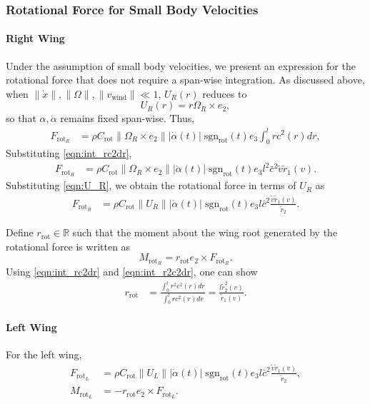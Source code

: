 \documentclass[10pt,draft]{article}
\renewcommand{\Re}{\ensuremath{\mathbb{R}}}
\newcommand{\rot}{\ensuremath{\mathrm{rot}}}
\begin{document}
\subsubsection{Rotational Force for Small Body Velocities}

\paragraph{Right Wing}

Under the assumption of small body velocities, we present an expression for the rotational force that does not require a span-wise integration. 
As discussed above, when $\|\dot x\|,\|\Omega\|, \|v_{\mathrm{wind}}\| \ll 1$, $U_R(r)$ reduces to
\[
    U_R(r) = r \Omega_R \times e_2,
\]
so that $\alpha,\dot\alpha$ remains fixed span-wise. 
Thus,
\begin{align*}
    F_{\rot_R} & = \rho C_\rot  \|\Omega_R \times e_2 \| |\dot\alpha(t)|\; \mathrm{sgn}_\rot(t)  e_3 \int_0^l r c^2(r) dr,
\end{align*}
Substituting \eqref{eqn:int_rc2dr},
\begin{align*}
    F_{\rot_R} & = \rho C_\rot  \|\Omega_R \times e_2 \| |\dot\alpha(t)|\; \mathrm{sgn}_\rot(t)  e_3 l^2 \bar c^2 \tilde v \tilde r_1(v).
\end{align*}
Substituting \eqref{eqn:U_R}, we obtain the rotational force in terms of $U_R$ as 
\begin{align}
    F_{\rot_R} & = \rho C_\rot  \|U_R \| |\dot\alpha(t)|\; \mathrm{sgn}_\rot(t)  e_3 l \bar c^2 \frac{\tilde v \tilde r_1(v)}{\tilde r_2}. \label{eqn:F_rot}
\end{align}

Define $r_\rot\in\Re$ such that the moment about the wing root generated by the rotational force is written as
\begin{equation}
    M_{\rot_R} = r_\rot e_2 \times F_{\rot_R}.
\end{equation}
Using \eqref{eqn:int_rc2dr} and \eqref{eqn:int_r2c2dr}, one can show
\begin{align}
    r_\rot & = \frac{\int_0^l r^2 c^2(r) dr}{\int_0^l r c^2(r) dr} = \frac{l\tilde r_2^2(v)}{\tilde r_1(v)}.
\end{align}

\paragraph{Left Wing}

For the left wing,
\begin{align}
    F_{\rot_L} & = \rho C_\rot  \|U_L \| |\dot\alpha(t)|\; \mathrm{sgn}_\rot(t)  e_3 l \bar c^2 \frac{\tilde v \tilde r_1(v)}{\tilde r_2}, \label{eqn:F_rot_L}\\
    M_{\rot_L} &  = -r_\rot e_2 \times F_{\rot_L}.
\end{align}
\end{document}
